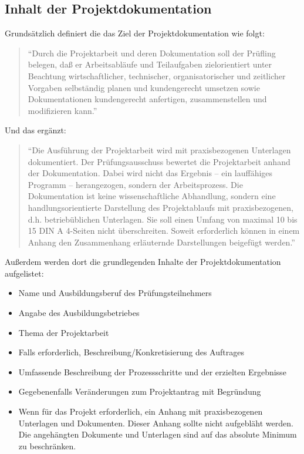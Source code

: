 \subsection*{Inhalt der Projektdokumentation}

Grundsätzlich definiert die \citet[S.~1746]{Bundesgesetzblatt48}\QuelleLiegtBei das Ziel der Projektdokumentation wie folgt:
\begin{quote}
"`Durch die Projektarbeit und deren Dokumentation soll der Prüfling belegen, daß er Arbeitsabläufe und Teilaufgaben zielorientiert unter Beachtung wirtschaftlicher, technischer, organisatorischer und zeitlicher Vorgaben selbständig planen und kundengerecht umsetzen sowie Dokumentationen kundengerecht anfertigen, zusammenstellen und modifizieren kann."'
\end{quote}

Und das \citet[S.~36]{BMBF2000}\QuelleLiegtBei ergänzt:
\begin{quote}
"`Die Ausführung der Projektarbeit wird mit praxisbezogenen Unterlagen dokumentiert.
Der Prüfungsausschuss bewertet die Projektarbeit anhand der Dokumentation. Dabei
wird nicht das Ergebnis -- \zB ein lauffähiges Programm -- herangezogen, sondern
der Arbeitsprozess. Die Dokumentation ist keine wissenschaftliche Abhandlung,
sondern eine handlungsorientierte Darstellung des Projektablaufs mit
praxisbezogenen, d.h. betriebüblichen Unterlagen. Sie soll einen Umfang von
maximal 10 bis 15 DIN A 4-Seiten nicht überschreiten. Soweit erforderlich können in
einem Anhang \zB den Zusammenhang erläuternde Darstellungen beigefügt werden."'
\end{quote}

Außerdem werden dort die grundlegenden Inhalte der Projektdokumentation aufgelistet:
\begin{itemize}
	\item Name und Ausbildungsberuf des Prüfungsteilnehmers
	\item Angabe des Ausbildungsbetriebes
	\item Thema der Projektarbeit
	\item Falls erforderlich, Beschreibung/Konkretisierung des Auftrages
	\item Umfassende Beschreibung der Prozessschritte und der erzielten Ergebnisse
	\item Gegebenenfalls Veränderungen zum Projektantrag mit Begründung
	\item Wenn für das Projekt erforderlich, ein Anhang mit praxisbezogenen Unterlagen und Dokumenten. Dieser Anhang sollte nicht aufgebläht werden. Die angehängten Dokumente und Unterlagen sind auf das absolute Minimum zu beschränken.
\end{itemize}

